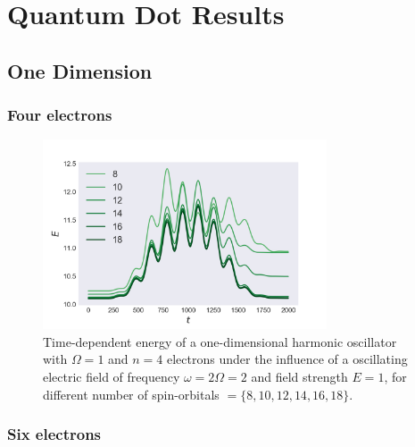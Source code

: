 \chapter{Quantum Dot Results}

\section{One Dimension}

\subsection*{Four electrons}

\begin{figure}[h]
    \centering
    \includegraphics[width=0.75\textwidth]{results/figures/1D/n=4energy.png} 
    \caption{Time-dependent energy of a one-dimensional harmonic oscillator with $\Omega=1$
        and $n=4$ electrons under the influence of a oscillating electric field 
        of frequency $\omega = 2 \Omega = 2$ and field strength $E=1$, for 
        different number of spin-orbitals $=\{8,10,12,14,16,18\}$.
    }
    \label{fig:1d_n4_qd}
\end{figure}

\pagebreak

\subsection*{Six electrons}

